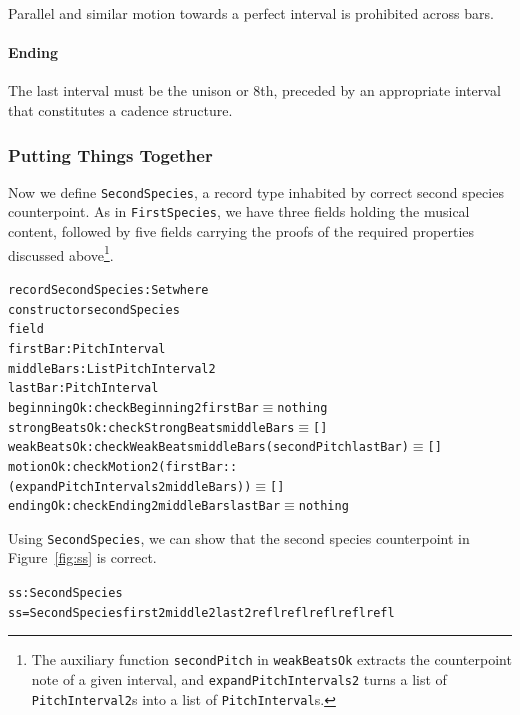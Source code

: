 Parallel and similar motion towards a perfect interval is prohibited
across bars.

\paragraph{Ending}

The last interval must be the unison or 8th, preceded by an
appropriate interval that constitutes a cadence structure.

\subsubsection{Putting Things Together}

Now we define \texttt{SecondSpecies}, a record type inhabited by
correct second species counterpoint.
As in \texttt{FirstSpecies}, we have three fields holding the musical
content, followed by five fields carrying the proofs of the required
properties discussed above\footnote{
  The auxiliary function \texttt{secondPitch} in \texttt{weakBeatsOk}
  extracts the counterpoint note of a given interval, and
  \texttt{expandPitchIntervals2} turns a list of \texttt{PitchInterval2}s
  into a list of \texttt{PitchInterval}s.
}.

\begin{alltt}
record SecondSpecies : Set where
  constructor secondSpecies
  field
    firstBar      : PitchInterval 
    middleBars    : List PitchInterval2
    lastBar       : PitchInterval 
    beginningOk   : checkBeginning2 firstBar \(\equiv\) nothing
    strongBeatsOk : checkStrongBeats middleBars \(\equiv\) []
    weakBeatsOk   : checkWeakBeats middleBars (secondPitch lastBar) \(\equiv\) []
    motionOk      : checkMotion2 (firstBar ::
                                  (expandPitchIntervals2 middleBars)) \(\equiv\) []
    endingOk      : checkEnding2 middleBars lastBar \(\equiv\) nothing
\end{alltt}

Using \texttt{SecondSpecies}, we can show that the second species
counterpoint in Figure~\ref{fig:ss} is correct.

\begin{alltt}
ss : SecondSpecies
ss = SecondSpecies first2 middle2 last2 refl refl refl refl refl
\end{alltt}

